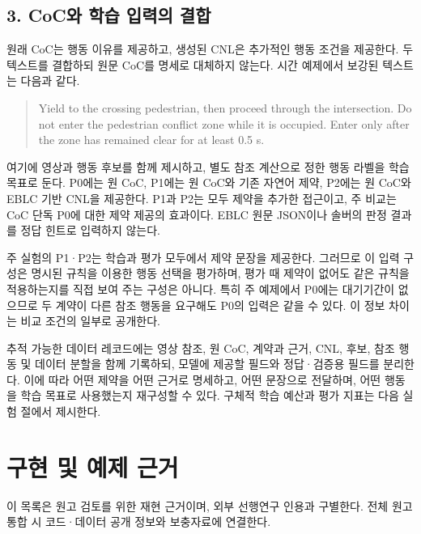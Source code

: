\documentclass[11pt,a4paper]{article}
\begin{document}
\subsection*{3. CoC와 학습 입력의 결합}

원래 CoC는 행동 이유를 제공하고, 생성된 CNL은 추가적인 행동 조건을 제공한다. 두 텍스트를 결합하되 원문 CoC를 명세로 대체하지 않는다. 시간 예제에서 보강된 텍스트는 다음과 같다.\par

\begin{quote}Yield to the crossing pedestrian, then proceed through the intersection. Do not enter the pedestrian conflict zone while it is occupied. Enter only after the zone has remained clear for at least 0.5 s.\end{quote}

여기에 영상과 행동 후보를 함께 제시하고, 별도 참조 계산으로 정한 행동 라벨을 학습 목표로 둔다. P0에는 원 CoC, P1에는 원 CoC와 기존 자연어 제약, P2에는 원 CoC와 EBLC 기반 CNL을 제공한다. P1과 P2는 모두 제약을 추가한 접근이고, 주 비교는 CoC 단독 P0에 대한 제약 제공의 효과이다. EBLC 원문 JSON이나 솔버의 판정 결과를 정답 힌트로 입력하지 않는다.\par

주 실험의 P1·P2는 학습과 평가 모두에서 제약 문장을 제공한다. 그러므로 이 입력 구성은 명시된 규칙을 이용한 행동 선택을 평가하며, 평가 때 제약이 없어도 같은 규칙을 적용하는지를 직접 보여 주는 구성은 아니다. 특히 주 예제에서 P0에는 대기기간이 없으므로 두 계약이 다른 참조 행동을 요구해도 P0의 입력은 같을 수 있다. 이 정보 차이는 비교 조건의 일부로 공개한다.\par

추적 가능한 데이터 레코드에는 영상 참조, 원 CoC, 계약과 근거, CNL, 후보, 참조 행동 및 데이터 분할을 함께 기록하되, 모델에 제공할 필드와 정답·검증용 필드를 분리한다. 이에 따라 어떤 제약을 어떤 근거로 명세하고, 어떤 문장으로 전달하며, 어떤 행동을 학습 목표로 사용했는지 재구성할 수 있다. 구체적 학습 예산과 평가 지표는 다음 실험 절에서 제시한다.\par

\section*{구현 및 예제 근거}

이 목록은 원고 검토를 위한 재현 근거이며, 외부 선행연구 인용과 구별한다. 전체 원고 통합 시 코드·데이터 공개 정보와 보충자료에 연결한다.\par
\end{document}
